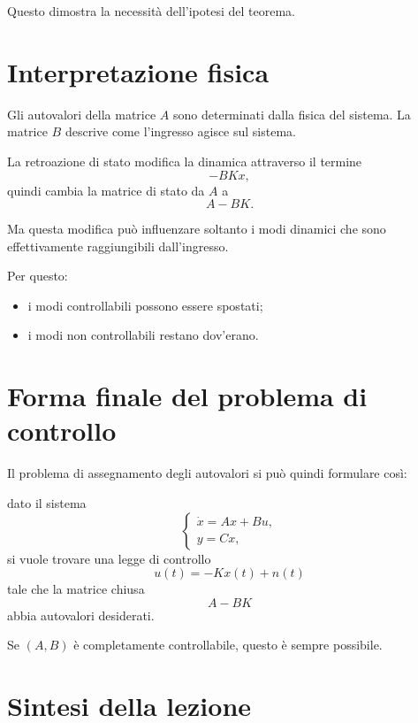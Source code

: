 Questo dimostra la necessità dell'ipotesi del teorema.

\section{Interpretazione fisica}

Gli autovalori della matrice \(A\) sono determinati dalla fisica del sistema.
La matrice \(B\) descrive come l'ingresso agisce sul sistema.

La retroazione di stato modifica la dinamica attraverso il termine
\[
-BKx,
\]
quindi cambia la matrice di stato da \(A\) a
\[
A-BK.
\]

Ma questa modifica può influenzare soltanto i modi dinamici che sono effettivamente raggiungibili
dall'ingresso.

Per questo:
\begin{itemize}
    \item i modi controllabili possono essere spostati;
    \item i modi non controllabili restano dov'erano.
\end{itemize}

\section{Forma finale del problema di controllo}

Il problema di assegnamento degli autovalori si può quindi formulare così:

dato il sistema
\[
\begin{cases}
\dot x=Ax+Bu,\\
y=Cx,
\end{cases}
\]
si vuole trovare una legge di controllo
\[
u(t)=-Kx(t)+n(t)
\]
tale che la matrice chiusa
\[
A-BK
\]
abbia autovalori desiderati.

Se \((A,B)\) è completamente controllabile, questo è sempre possibile.

\section{Sintesi della lezione}

